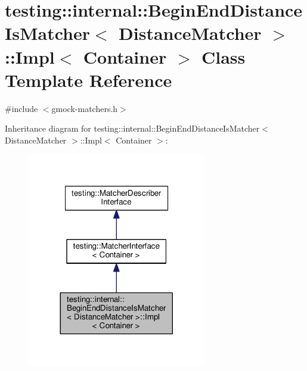 \hypertarget{classtesting_1_1internal_1_1BeginEndDistanceIsMatcher_1_1Impl}{}\section{testing\+:\+:internal\+:\+:Begin\+End\+Distance\+Is\+Matcher$<$ Distance\+Matcher $>$\+:\+:Impl$<$ Container $>$ Class Template Reference}
\label{classtesting_1_1internal_1_1BeginEndDistanceIsMatcher_1_1Impl}


{\ttfamily \#include $<$gmock-\/matchers.\+h$>$}



Inheritance diagram for testing\+:\+:internal\+:\+:Begin\+End\+Distance\+Is\+Matcher$<$ Distance\+Matcher $>$\+:\+:Impl$<$ Container $>$\+:
\nopagebreak
\begin{figure}[H]
\begin{center}
\leavevmode
\includegraphics[width=221pt]{classtesting_1_1internal_1_1BeginEndDistanceIsMatcher_1_1Impl__inherit__graph}
\end{center}
\end{figure}


